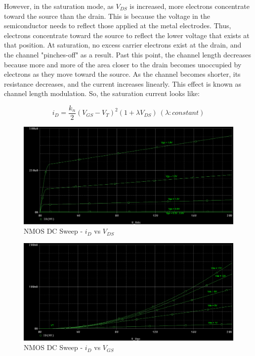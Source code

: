 However, in the saturation mode, as $V_{DS}$ is increased, more electrons concentrate toward the source than the drain. This is because the voltage in the semiconductor needs to reflect those applied at the metal electrodes. Thus, electrons concentrate toward the source to reflect the lower voltage that exists at that position. At saturation, no excess carrier electrons exist at the drain, and the channel "pinches-off" as a result. Past this point, the channel length decreases because more and more of the area closer to the drain becomes unoccupied by electrons as they move toward the source. As the channel becomes shorter, its resistance decreases, and the current increases linearly. This effect is known as channel length modulation. So, the saturation current looks like:

\begin{equation}
	\label{eq:sat_current_clm}
	i_D = \frac{k_n}{2} ( V_{GS} - V_{T} )^2 ( 1 + \lambda V_{DS} ) \ ( \lambda: constant )
\end{equation}

\FloatBarrier

\begin{figure}[h!]
	\centering
	\includegraphics[scale=0.5]{./images/circuit1_vds_sweep.PNG}
	\caption{NMOS DC Sweep - $i_D$ vs $V_{DS}$}
	\label{fig:circuit1_vds_sweep}
\end{figure}

\FloatBarrier

\FloatBarrier

\begin{figure}[h!]
	\centering
	\includegraphics[scale=0.5]{./images/circuit1_full_sweep.PNG}
	\caption{NMOS DC Sweep - $i_D$ vs $V_{GS}$}
	\label{fig:circuit1_full_sweep}
\end{figure}

